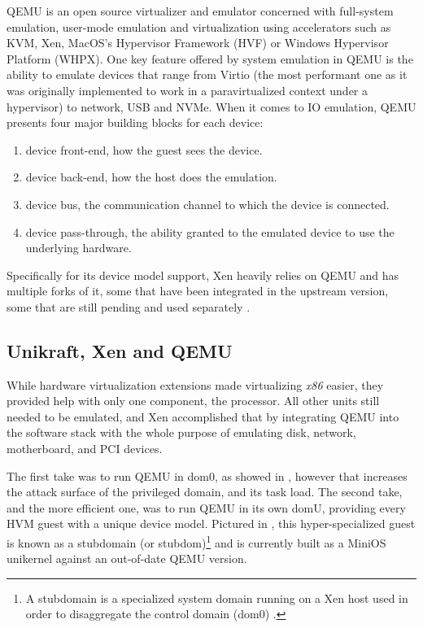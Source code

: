 QEMU \cite{qemu} is an open source virtualizer and emulator concerned with full-system emulation, user-mode emulation and virtualization using accelerators such as KVM, Xen, MacOS's Hypervisor Framework (HVF) or Windows Hypervisor Platform (WHPX).
One key feature offered by system emulation in QEMU is the ability to emulate devices that range from Virtio (the most performant one as it was originally implemented to work in a paravirtualized context under a hypervisor) \cite{virtio} to network, USB and NVMe.
When it comes to IO emulation, QEMU presents four major building blocks for each device: 

\begin{enumerate}
  \item device front-end, how the guest sees the device.
  \item device back-end, how the host does the emulation.
  \item device bus, the communication channel to which the device is connected.
  \item device pass-through, the ability granted to the emulated device to use the underlying hardware.
\end{enumerate}

Specifically for its device model support, Xen heavily relies on QEMU and has multiple forks of it, some that have been integrated in the upstream version, some that are still pending and used separately \cite{qemu-qemu-traditional}. 

\subsection{Unikraft, Xen and QEMU}
\label{subsec:unikraft-xen}

While hardware virtualization extensions made virtualizing \textit{x86} easier, they provided help with only one component, the processor.
All other units still needed to be emulated, and Xen accomplished that by integrating QEMU into the software stack with the whole purpose of emulating disk, network, motherboard, and PCI devices.

The first take was to run QEMU in dom0, as showed in  , however that increases the attack surface of the privileged domain, and its task load.
The second take, and the more efficient one, was to run QEMU in its own domU, providing every HVM guest with a unique device model.
Pictured in , this hyper-specialized guest is known as a stubdomain (or stubdom)\footnote{A stubdomain is a specialized system domain running on a Xen host used in order to disaggregate the control domain (dom0) \cite{xen-stubdomain}.} and is currently built as a MiniOS \cite{minios} unikernel against an out-of-date QEMU version.

